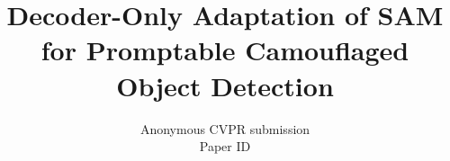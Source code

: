 \documentclass[10pt,twocolumn,letterpaper]{article}
\title{Decoder-Only Adaptation of SAM for Promptable Camouflaged Object Detection}
\author{Anonymous CVPR submission\\Paper ID \paperID}
\begin{document}
\maketitle








{
    \small
    
    
}
\end{document}
